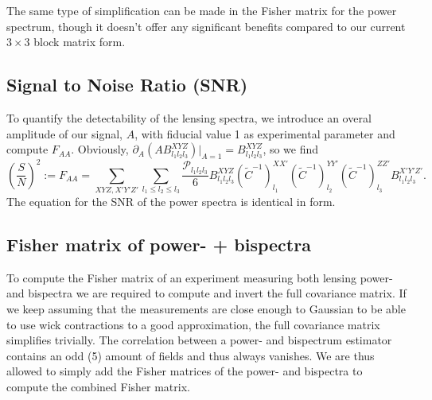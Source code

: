 \documentclass[11pt]{article} %
\DeclareRobustCommand{\Cov}{\ifmmode\text{Cov}\else d\fi}
\newcommand{\br}[1]{\ensuremath{\left( #1 \right)}}
\begin{document}
The same type of simplification can be made in the Fisher matrix for the power spectrum, though it doesn't offer any significant benefits compared to our current $3\times 3$ block matrix form.

\subsection{Signal to Noise Ratio (SNR)}
To quantify the detectability of the lensing spectra, we introduce an overal amplitude of our signal, $A$, with fiducial value 1 as experimental parameter and compute $F_{AA}$. Obviously, $\partial_A\br{A B^{XYZ}_{l_1l_2l_3}}|_{A=1} = B^{XYZ}_{l_1l_2l_3}$, so we find
\begin{equation*}
    \br{\frac{S}{N}}^2 := F_{AA} =
\sum_{XYZ, X'Y'Z'} \sum_{l_1\leq l_2 \leq l_3} \frac{\mathcal P _{l_1l_2l_3}}{6}
B^{X Y Z}_{l_1 l_2 l_3} 
(\tilde C^{-1})^{X X'}_{l_1}
(\tilde C^{-1})^{Y Y'}_{l_2}
(\tilde C^{-1})^{Z Z'}_{l_3}
B^{X' Y' Z'}_{l_1 l_2 l_3}.
\end{equation*}
The equation for the SNR of the power spectra is identical in form.

\subsection{Fisher matrix of power- + bispectra}
To compute the Fisher matrix of an experiment measuring both lensing power- and bispectra we are required to compute and invert the full covariance matrix. If we keep assuming that the measurements are close enough to Gaussian to be able to use wick contractions to a good approximation, the full covariance matrix simplifies trivially. The correlation between a power- and bispectrum estimator contains an odd (5) amount of fields and thus always vanishes. We are thus allowed to simply add the Fisher matrices of the power- and bispectra to compute the combined Fisher matrix.  


\end{document}
